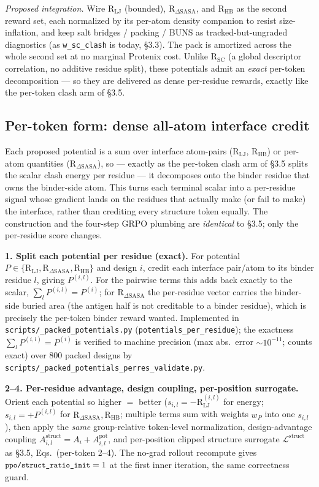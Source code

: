 \documentclass[11pt]{article}
\newcommand{\R}{\mathrm{R}}
\newcommand{\SC}{\mathrm{SC}}
\newcommand{\ttk}[1]{\texttt{\small #1}}
\begin{document}
\emph{Proposed integration.} Wire $\R_{\mathrm{LJ}}$ (bounded), $\R_{\Delta\mathrm{SASA}}$, and
$\R_{\mathrm{HB}}$ as the second reward set, each normalized by its per-atom density companion to
resist size-inflation, and keep salt bridges / packing / BUNS as tracked-but-ungraded diagnostics
(as \ttk{w\_sc\_clash} is today, \S3.3). The pack is amortized across the whole second set at no
marginal Protenix cost. Unlike $\R_{\SC}$ (a global descriptor correlation, no additive residue
split), these potentials admit an \emph{exact} per-token decomposition --- so they are delivered as
dense per-residue rewards, exactly like the per-token clash arm of \S3.5.

\subsection{Per-token form: dense all-atom interface credit}
\label{sec:pertoken-pot}
Each proposed potential is a sum over interface atom-pairs ($\R_{\mathrm{LJ}}$, $\R_{\mathrm{HB}}$)
or per-atom quantities ($\R_{\Delta\mathrm{SASA}}$), so --- exactly as the per-token clash arm of
\S3.5 splits the scalar clash energy per residue --- it decomposes onto the binder residue that owns
the binder-side atom. This turns each terminal scalar into a per-residue signal whose gradient lands
on the residues that actually make (or fail to make) the interface, rather than crediting every
structure token equally. The construction and the four-step GRPO plumbing are \emph{identical} to
\S3.5; only the per-residue score changes.

\textbf{1. Split each potential per residue (exact).} For potential $P\in\{\R_{\mathrm{LJ}},
\R_{\Delta\mathrm{SASA}},\R_{\mathrm{HB}}\}$ and design $i$, credit each interface pair/atom to its
binder residue $l$, giving $P^{(i,l)}$. For the pairwise terms this adds back exactly to the scalar,
$\sum_l P^{(i,l)}=P^{(i)}$; for $\R_{\Delta\mathrm{SASA}}$ the per-residue vector carries the
binder-side buried area (the antigen half is not creditable to a binder residue), which is precisely
the per-token binder reward wanted. Implemented in \ttk{scripts/\_packed\_potentials.py}
(\ttk{potentials\_per\_residue}); the exactness $\sum_l P^{(i,l)}=P^{(i)}$ is verified to machine
precision (max abs.\ error $\sim\!10^{-11}$; counts exact) over $800$ packed designs by
\ttk{scripts/\_packed\_potentials\_perres\_validate.py}.

\textbf{2--4. Per-residue advantage, design coupling, per-position surrogate.} Orient each potential
so higher $=$ better ($s_{i,l}=-\R_{\mathrm{LJ}}^{(i,l)}$ for energy; $s_{i,l}=+P^{(i,l)}$ for
$\R_{\Delta\mathrm{SASA}},\R_{\mathrm{HB}}$; multiple terms sum with weights $w_P$ into one
$s_{i,l}$), then apply the \emph{same} group-relative token-level normalization, design-advantage
coupling $A^{\text{struct}}_{i,l}=A_i+A^{\text{pot}}_{i,l}$, and per-position clipped structure
surrogate $\mathcal L^{\text{struct}}$ as \S3.5, Eqs.\ (per-token 2--4). The no-grad rollout
recompute gives $\ttk{ppo/struct\_ratio\_init}=1$ at the first inner iteration, the same correctness
guard.
\end{document}
